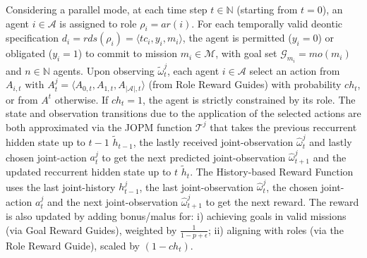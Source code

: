 \documentclass[pdflatex,sn-mathphys-num]{sn-jnl}%
\theoremstyle{thmstyleone}%
\theoremstyle{thmstyletwo}%
\theoremstyle{thmstylethree}%
\begin{document}
\noindent Considering a parallel mode, at each time step $t \in \mathbb{N}$ (starting from $t=0$), an agent $i \in \mathcal{A}$ is assigned to role $\rho_i = ar(i)$. For each temporally valid deontic specification $d_i = rds(\rho_i) = \langle tc_i, y_i, m_i \rangle$, the agent is permitted ($y_i = 0$) or obligated ($y_i = 1$) to commit to mission $m_i \in \mathcal{M}$, with goal set $\mathcal{G}_{m_i} = mo(m_i)$ and $n \in \mathbb{N}$ agents.
%
Upon observing $\tilde{\omega}^j_t$, each agent $i \in \mathcal{A}$ select an action from $A_{i,t} \text{ with } A^j_t = \langle A_{0,t}, A_{1,t}, A_{|\mathcal{A}|,t}\rangle$ (from Role Reward Guides) with probability $ch_t$, or from $A^t$ otherwise. If $ch_t = 1$, the agent is strictly constrained by its role.
%
The state and observation transitions due to the application of the selected actions are both approximated via the JOPM function $\mathcal{T}^j$ that takes the previous reccurrent hidden state up to $t-1$ $\tilde{h}_{t-1}$, the lastly received joint-observation $\hat{\omega}_t^j$ and lastly chosen joint-action $a_t^j$ to get the next predicted joint-observation $\hat{\omega}_{t+1}^j$ and the updated reccurrent hidden state up to $t$ $\tilde{h}_t$. The History-based Reward Function uses the last joint-history $h^j_{t-1}$, the last joint-observation $\hat{\omega}_t^j$, the chosen joint-action $a_t^j$ and the next joint-observation $\hat{\omega}^j_{t+1}$ to get the next reward. The reward is also updated by adding bonus/malus for:
i) achieving goals in valid missions (via Goal Reward Guides), weighted by $\frac{1}{1 - p + \epsilon}$;
ii) aligning with roles (via the Role Reward Guide), scaled by $(1-ch_t)$.
\end{document}
